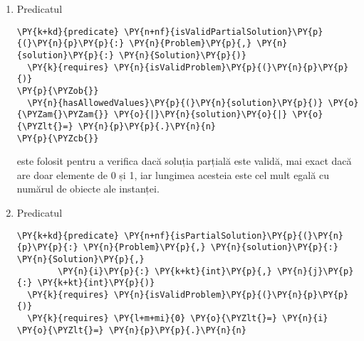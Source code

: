 \begin{sloppypar}
\begin{enumerate}
\begin{Verbatim}[commandchars=\\\{\}]
\PY{k+kd}{predicate} \PY{n+nf}{isValidProblem}\PY{p}{(}\PY{n}{p}\PY{p}{:} \PY{n}{Problem}\PY{p}{)}
\PY{p}{\PYZob{}}
  \PY{o}{|}\PY{n}{p}\PY{p}{.}\PY{n}{gains}\PY{o}{|} \PY{o}{==} \PY{o}{|}\PY{n}{p}\PY{p}{.}\PY{n}{weights}\PY{o}{|} \PY{o}{==} \PY{n}{p}\PY{p}{.}\PY{n}{n} \PY{o}{\PYZam{}\PYZam{}} 
  \PY{n}{p}\PY{p}{.}\PY{n}{n} \PY{o}{\PYZgt{}} \PY{l+m+mi}{0} \PY{o}{\PYZam{}\PYZam{}} \PY{n}{p}\PY{p}{.}\PY{n}{c} \PY{o}{\PYZgt{}=} \PY{l+m+mi}{0} \PY{o}{\PYZam{}\PYZam{}} 
  \PY{n}{hasPositiveValues}\PY{p}{(}\PY{n}{p}\PY{p}{.}\PY{n}{gains}\PY{p}{)} \PY{o}{\PYZam{}\PYZam{}} \PY{n}{hasPositiveValues}\PY{p}{(}\PY{n}{p}\PY{p}{.}\PY{n}{weights}\PY{p}{)} 
\PY{p}{\PYZcb{}}
\end{Verbatim}
    este un predicat foarte important, folosit ca precondiție aproape pentru fiecare funcție și metodă din cod. Acest predicat este folosit ca validator pentru instanța problemei a cărei soluție optimă încercăm să găsim. Ne așteptăm astfel să avem cel puțin un obiect la dispoziție și un rucsac de capacitate mai mare decât zero, să știm greutatea și câștigul fiecărui obiect, iar acestea să fie la rândul lor valori pozitive diferite de zero.
    \item Predicatul 
    \begin{Verbatim}[commandchars=\\\{\}]
\PY{k+kd}{predicate} \PY{n+nf}{isValidPartialSolution}\PY{p}{(}\PY{n}{p}\PY{p}{:} \PY{n}{Problem}\PY{p}{,} \PY{n}{solution}\PY{p}{:} \PY{n}{Solution}\PY{p}{)}
  \PY{k}{requires} \PY{n}{isValidProblem}\PY{p}{(}\PY{n}{p}\PY{p}{)}
\PY{p}{\PYZob{}}
  \PY{n}{hasAllowedValues}\PY{p}{(}\PY{n}{solution}\PY{p}{)} \PY{o}{\PYZam{}\PYZam{}} \PY{o}{|}\PY{n}{solution}\PY{o}{|} \PY{o}{\PYZlt{}=} \PY{n}{p}\PY{p}{.}\PY{n}{n}
\PY{p}{\PYZcb{}}
\end{Verbatim}
    este folosit pentru a verifica dacă soluția parțială este validă, mai exact dacă are doar elemente de 0 și 1, iar lungimea acesteia este cel mult egală cu numărul de obiecte ale instanței.
    \item Predicatul 
    \begin{Verbatim}[commandchars=\\\{\}]
\PY{k+kd}{predicate} \PY{n+nf}{isPartialSolution}\PY{p}{(}\PY{n}{p}\PY{p}{:} \PY{n}{Problem}\PY{p}{,} \PY{n}{solution}\PY{p}{:} \PY{n}{Solution}\PY{p}{,} 
        \PY{n}{i}\PY{p}{:} \PY{k+kt}{int}\PY{p}{,} \PY{n}{j}\PY{p}{:} \PY{k+kt}{int}\PY{p}{)}
  \PY{k}{requires} \PY{n}{isValidProblem}\PY{p}{(}\PY{n}{p}\PY{p}{)}
  \PY{k}{requires} \PY{l+m+mi}{0} \PY{o}{\PYZlt{}=} \PY{n}{i} \PY{o}{\PYZlt{}=} \PY{n}{p}\PY{p}{.}\PY{n}{n}

\end{Verbatim}
\end{enumerate}
\end{sloppypar}
